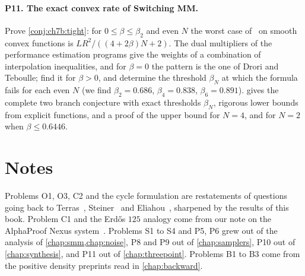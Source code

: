 \paragraph{P11. The exact convex rate of Switching MM.} Prove
\cref{conj:ch7b:tight}: for $0\le\beta\le\beta_2$ and even $N$ the worst case of
\smmdet\ on smooth convex functions is $LR^2/((4+2\beta)N+2)$. The dual
multipliers of the performance estimation programs give the weights of a
combination of interpolation inequalities, and for $\beta=0$ the pattern is the
one of Drori and Teboulle; find it for $\beta>0$, and determine the threshold
$\beta_N$ at which the formula fails for each even $N$ (we find
$\beta_2=0.686$, $\beta_4=0.838$, $\beta_6=0.891$).
 gives the complete two branch conjecture with exact thresholds
$\beta_N$, rigorous lower bounds from explicit functions, and a proof of the upper
bound for $N=4$, and for $N=2$ when $\beta\le0.6446$.

\section*{Notes}

Problems O1, O3, C2 and the cycle formulation are restatements of questions
going back to Terras~\cite{terras1976}, Steiner~\cite{steiner1977} and
Eliahou~\cite{eliahou1993}, sharpened by the results of this book. Problem C1
and the Erd\H{o}s $125$ analogy come from our note on the AlphaProof Nexus
system~\cite{polsonsokolov2026nexus,tsoukalas2026}. Problems S1 to S4 and P5,
P6 grew out of the analysis of \cref{chap:smm,chap:noise}, P8 and P9 out
of \cref{chap:samplers}, P10 out of \cref{chap:synthesis}, and P11 out of
\cref{chap:threepoint}. Problems B1 to B3 come from the positive density preprints read in \cref{chap:backward}.
